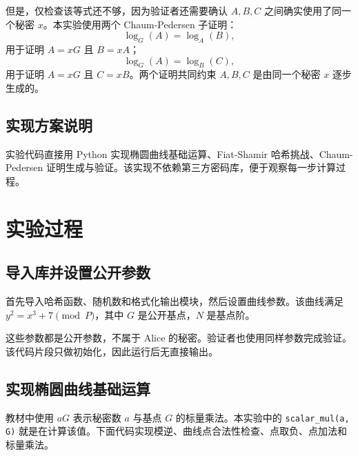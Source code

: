 \documentclass[a4paper]{article}
\begin{document}
	但是，仅检查该等式还不够，因为验证者还需要确认 \(A,B,C\) 之间确实使用了同一个秘密 \(x\)。本实验使用两个 Chaum-Pedersen 子证明：
	\[
		\log_G(A)=\log_A(B),
	\]
	用于证明 \(A=xG\) 且 \(B=xA\)；
	\[
		\log_G(A)=\log_B(C),
	\]
	用于证明 \(A=xG\) 且 \(C=xB\)。两个证明共同约束 \(A,B,C\) 是由同一个秘密 \(x\) 逐步生成的。
	
	\subsection{实现方案说明}
	实验代码直接用 Python 实现椭圆曲线基础运算、Fiat-Shamir 哈希挑战、Chaum-Pedersen 证明生成与验证。该实现不依赖第三方密码库，便于观察每一步计算过程。
	
	\section{实验过程}
	\subsection{导入库并设置公开参数}
	首先导入哈希函数、随机数和格式化输出模块，然后设置曲线参数。该曲线满足 \(y^{2}=x^{3}+7 \pmod P\)，其中 \(G\) 是公开基点，\(N\) 是基点阶。
	
	这些参数都是公开参数，不属于 Alice 的秘密。验证者也使用同样参数完成验证。该代码片段只做初始化，因此运行后无直接输出。
	
	\subsection{实现椭圆曲线基础运算}
	教材中使用 \(aG\) 表示秘密数 \(a\) 与基点 \(G\) 的标量乘法。本实验中的 \texttt{scalar\_mul(a, G)} 就是在计算该值。下面代码实现模逆、曲线点合法性检查、点取负、点加法和标量乘法。
	
\end{document}
